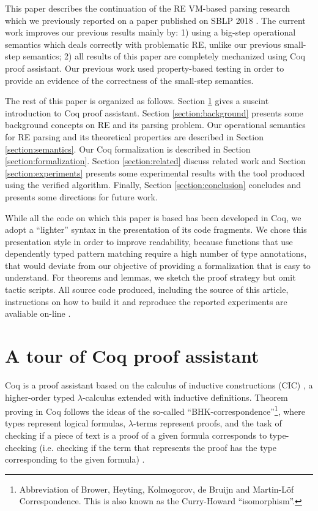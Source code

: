 This paper describes the continuation of the RE VM-based parsing research which we previously reported 
on a paper published on SBLP 2018 \cite{Delfino18}. The current work improves our previous results
mainly by: 1) using a big-step operational semantics which deals correctly with problematic RE, unlike
our previous small-step semantics; 2) all results of this paper are completely mechanized using Coq
proof assistant. Our previous work used property-based testing in order to provide an evidence of 
the correctness of the small-step semantics.    


The rest of this paper is organized as follows. Section \ref{section:coq} gives a 
suscint introduction to Coq proof assistant. Section \ref{section:background} presents some 
background concepts on RE and its parsing problem. 
Our operational semantics for RE parsing and its theoretical properties
are described in Section \ref{section:semantics}. Our Coq formalization is described in 
Section \ref{section:formalization}. Section \ref{section:related} discuss related work and Section 
\ref{section:experiments} presents some experimental results with the tool produced using the 
verified algorithm. Finally, Section \ref{section:conclusion} concludes and 
presents some directions for future work.


While all the code on which this paper is based has been developed in Coq,
we adopt a ``lighter'' syntax in the presentation of its code fragments. 
We chose this presentation style in order to improve readability, because
 functions that use dependently typed pattern matching require a high number of type
annotations, that would deviate from our objective of providing a formalization 
that is easy to understand. For theorems and lemmas, we sketch the proof strategy 
but omit tactic scripts.  All source code produced, including the source of this article, 
instructions on how to build it and reproduce the reported experiments are avaliable 
on-line \cite{regexvm-rep}.


\section{A tour of Coq proof assistant}


\label{section:coq}


Coq is a proof assistant based on the calculus of inductive
constructions (CIC) \cite{Bertot2010}, a higher-order typed
$\lambda$-calculus extended with inductive definitions. Theorem
proving in Coq follows the ideas of the so-called
``BHK-correspondence''\footnote{Abbreviation of Brower, Heyting,
  Kolmogorov, de Bruijn and Martin-L\"of Correspondence. This is also
  known as the Curry-Howard ``isomorphism''.}, where types represent
logical formulas, $\lambda$-terms represent proofs, and the task of
checking if a piece of text is a proof of a given formula corresponds
to type-checking (i.e. checking if the term that represents the proof
has the type corresponding to the given formula) \cite{Sorensen2006}.


